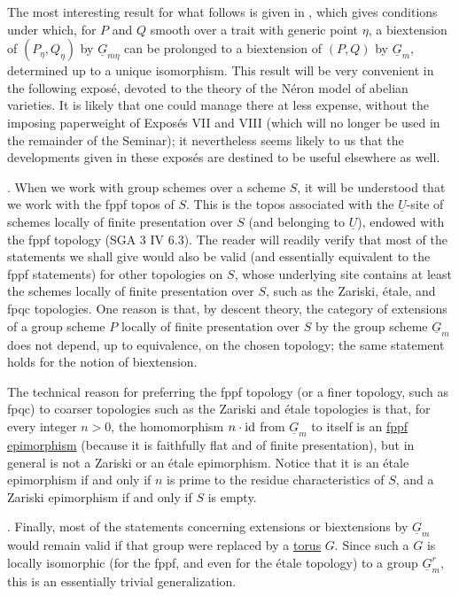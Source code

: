 The most interesting result for what follows is given in , which
gives conditions under which, for $P$ and $Q$ smooth over a trait with
generic point $\eta$, a biextension of $(P_\eta,Q_\eta)$ by
$\underline G_{m\eta}$ can be prolonged to a biextension of $(P,Q)$ by
$\underline G_m$, determined up to a unique isomorphism.  This result
will be very convenient in the following expos\'e, devoted to the
theory of the N\'eron model of abelian varieties.  It is likely that
one could manage there at less expense, without the imposing
paperweight of Expos\'es VII and VIII (which will no longer be used in
the remainder of the Seminar); it nevertheless seems likely to us that
the developments given in these expos\'es are destined to be useful
elsewhere as well.

. When we work with group schemes over a scheme $S$, it will be
understood that we work with the fppf topos of $S$.  This is the topos
associated with the $\underline U$-site of schemes locally of finite
presentation over $S$ (and belonging to $\underline U$), endowed with
the fppf topology (SGA 3 IV 6.3).  The reader will readily verify that
most of the statements we shall give would also be valid (and
essentially equivalent to the fppf statements) for other topologies on
$S$, whose underlying site contains at least the schemes locally of
finite presentation over $S$, such as the Zariski, \'etale, and fpqc
topologies.  One reason is that, by descent theory, the category of
extensions of a group scheme $P$ locally of finite presentation over
$S$ by the group scheme $\underline G_m$ does not depend, up to
equivalence, on the chosen topology; the same statement holds for the
notion of biextension.

The technical reason for preferring the fppf topology (or a finer
topology, such as fpqc) to coarser topologies such as the Zariski and
\'etale topologies is that, for every integer $n>0$, the homomorphism
$n\cdot\mathrm{id}$ from $\underline G_m$ to itself is an \underline{fppf
epimorphism} (because it is faithfully flat and of finite
presentation), but in general is not a Zariski or an \'etale
epimorphism.  Notice that it is an \'etale epimorphism if and only if
$n$ is prime to the residue characteristics of $S$, and a Zariski
epimorphism if and only if $S$ is empty.

. Finally, most of the statements concerning extensions or
biextensions by $\underline G_m$ would remain valid if that group were
replaced by a \underline{torus} $G$.  Since such a $G$ is locally
isomorphic (for the fppf, and even for the \'etale topology) to a group
$\underline G_m^r$, this is an essentially trivial generalization.

